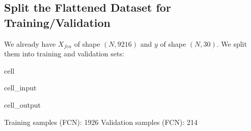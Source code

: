 \documentclass[letterpaper,10pt,english]{jupyterBook}
\begin{document}
\subsection{Split the Flattened Dataset for Training/Validation}
\label{\detokenize{04:split-the-flattened-dataset-for-training-validation}}
\sphinxAtStartPar
We already have \(X_{fcn}\) of shape \((N, 9216)\) and \(y\) of shape \((N, 30)\). We split them into training and validation sets:

\begin{sphinxuseclass}{cell}\begin{sphinxVerbatimInput}

\begin{sphinxuseclass}{cell_input}
\begin{sphinxVerbatim}[commandchars=\\\{\}]
 

     
       

  
       
\end{sphinxVerbatim}

\end{sphinxuseclass}\end{sphinxVerbatimInput}
\begin{sphinxVerbatimOutput}

\begin{sphinxuseclass}{cell_output}
\begin{sphinxVerbatim}[commandchars=\\\{\}]
Training samples (FCN): 1926 Validation samples (FCN): 214
\end{sphinxVerbatim}

\end{sphinxuseclass}\end{sphinxVerbatimOutput}

\end{sphinxuseclass}
\end{document}

